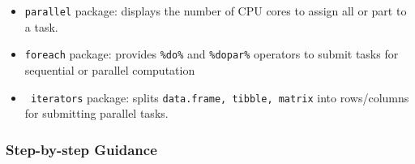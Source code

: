 \documentclass[
]{article}
\begin{document}
\begin{itemize}
\item
  \texttt{parallel} package: displays the number of CPU cores to assign
  all or part to a task.
\item
  \texttt{foreach} package: provides \texttt{\%do\%} and
  \texttt{\%dopar\%} operators to submit tasks for sequential or
  parallel computation
\item
  \texttt{\textasciigrave{}\ iterators} package: splits
  \texttt{data.frame,\ tibble,\ matrix} into rows/columns for submitting
  parallel tasks.
\end{itemize}

\hypertarget{step-by-step-guidance}{%
\subsubsection{Step-by-step Guidance}\label{step-by-step-guidance}}
\end{document}
